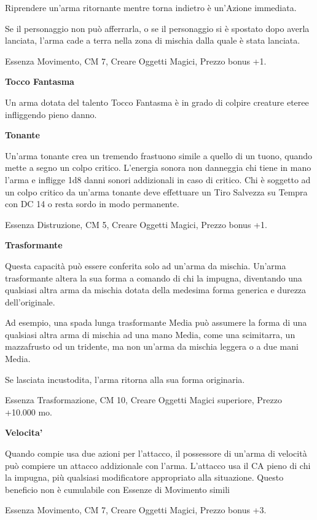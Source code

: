 \documentclass[a4paper,11pt,twoside,openany]{book}
\begin{document}
Riprendere un'arma ritornante mentre torna indietro è un'Azione immediata.

Se il personaggio non può afferrarla, o se il personaggio si è spostato dopo averla lanciata, l'arma cade a terra nella zona di mischia dalla quale è stata lanciata.

Essenza Movimento, CM 7, Creare Oggetti Magici, Prezzo bonus +1.

\textbf{Tocco Fantasma}

Un arma dotata del talento Tocco Fantasma è in grado di colpire creature eteree infliggendo pieno danno.

\textbf{Tonante}

Un'arma tonante crea un tremendo frastuono simile a quello di un tuono, quando mette a segno un colpo critico. L'energia sonora non danneggia chi tiene in mano l'arma e infligge 1d8 danni sonori addizionali in caso di critico. Chi è soggetto ad un colpo critico da un'arma tonante deve effettuare un Tiro Salvezza su Tempra con DC 14 o resta sordo in modo permanente.

Essenza Distruzione, CM 5, Creare Oggetti Magici, Prezzo bonus +1.

\textbf{Trasformante}

Questa capacità può essere conferita solo ad un'arma da mischia. Un'arma trasformante altera la sua forma a comando di chi la impugna, diventando una qualsiasi altra arma da mischia dotata della medesima forma generica e durezza dell'originale.

Ad esempio, una spada lunga trasformante Media può assumere la forma di una qualsiasi altra arma di mischia ad una mano Media, come una scimitarra, un mazzafrusto od un tridente, ma non un'arma da mischia leggera o a due mani Media.

Se lasciata incustodita, l'arma ritorna alla sua forma originaria.

Essenza Trasformazione, CM 10, Creare Oggetti Magici superiore, Prezzo +10.000 mo.

\textbf{Velocita'}

Quando compie usa due azioni per l'attacco, il possessore di un'arma di velocità può compiere un attacco addizionale con l'arma. L'attacco usa il CA pieno di chi la impugna, più qualsiasi modificatore appropriato alla situazione. Questo beneficio non è cumulabile con Essenze di Movimento simili

Essenza Movimento, CM 7, Creare Oggetti Magici, Prezzo bonus +3.
\end{document}

